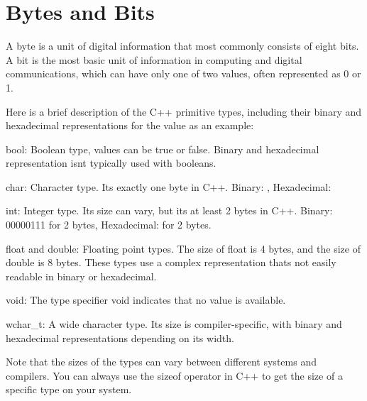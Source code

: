 \chapter{Bytes and Bits}
\hypertarget{md_docs_2own__docs_2cpp__fudamentals_2byte__and__bits}{}\label{md_docs_2own__docs_2cpp__fudamentals_2byte__and__bits}
\label{md_docs_2own__docs_2cpp__fudamentals_2byte__and__bits_autotoc_md40}%
%
 A byte is a unit of digital information that most commonly consists of eight bits. A bit is the most basic unit of information in computing and digital communications, which can have only one of two values, often represented as 0 or 1.

Here is a brief description of the C++ primitive types, including their binary and hexadecimal representations for the value {} as an example\+:


\begin{DoxyEnumerate}
\item {\ttfamily bool}\+: Boolean type, values can be {\ttfamily true} or {\ttfamily false}. Binary and hexadecimal representation isn\textquotesingle{}t typically used with booleans.
\item {\ttfamily char}\+: Character type. It\textquotesingle{}s exactly one byte in C++. Binary\+: {}, Hexadecimal\+: {}
\item {\ttfamily int}\+: Integer type. Its size can vary, but it\textquotesingle{}s at least 2 bytes in C++. Binary\+: { 00000111} for 2 bytes, Hexadecimal\+: {} for 2 bytes.
\item {\ttfamily float} and {\ttfamily double}\+: Floating point types. The size of {\ttfamily float} is 4 bytes, and the size of {\ttfamily double} is 8 bytes. These types use a complex representation that\textquotesingle{}s not easily readable in binary or hexadecimal.
\item {\ttfamily void}\+: The type specifier {\ttfamily void} indicates that no value is available.
\item {\ttfamily wchar\+\_\+t}\+: A wide character type. Its size is compiler-\/specific, with binary and hexadecimal representations depending on its width.
\end{DoxyEnumerate}

Note that the sizes of the types can vary between different systems and compilers. You can always use the {\ttfamily sizeof} operator in C++ to get the size of a specific type on your system.

